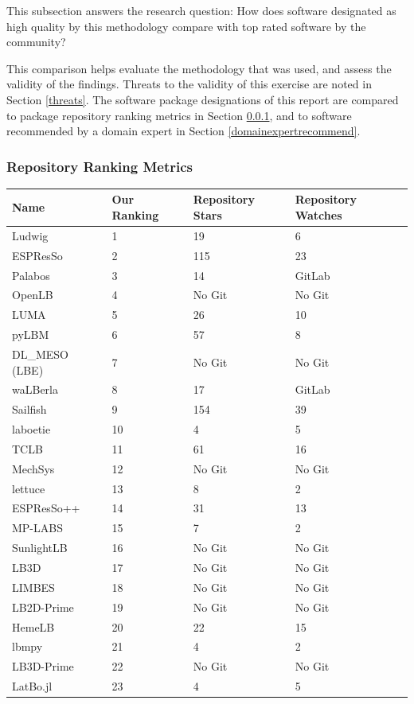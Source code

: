 \documentclass[12pt, notitlepage]{article}
\begin{document}
This subsection answers the research question: How does software designated as high quality by this methodology compare with top rated software by the community?

This comparison helps evaluate the methodology that was used, and assess the validity of the findings. Threats to the validity of this exercise are noted in Section \ref{threats}. The software package designations of this report are compared to package repository ranking metrics in Section \ref{repmetrics}, and to software recommended by a domain expert in Section \ref{domainexpertrecommend}.

\subsubsection{Repository Ranking Metrics}\label{repmetrics}

\begin{center}
	\begin{onehalfspacing}
		\begin{tabular}{ p{3.5cm}p{2.5cm}p{2.5cm}p{2.5cm} }
			\hline
			Name & Our Ranking & Repository Stars & Repository Watches \\
			\hline
			Ludwig&1& 19 & 6\\
			ESPResSo &2& 115 & 23\\
			Palabos &3& 14 & GitLab\\
			OpenLB &4& No Git & No Git\\
			LUMA&5& 26 & 10\\
			pyLBM &6& 57& 8\\
			DL\_MESO (LBE) & 7 & No Git & No Git \\
			waLBerla & 8 & 17 & GitLab\\
			Sailfish &9& 154 & 39\\
			laboetie &10& 4 & 5\\
			TCLB &11& 61 & 16\\
			MechSys &12& No Git & No Git\\
			lettuce &13& 8 & 2\\
			ESPResSo++ &14& 31 & 13\\
			MP-LABS &15& 7 & 2\\			
			SunlightLB & 16& No Git & No Git\\
			LB3D &17& No Git & No Git\\			
			LIMBES &18& No Git & No Git\\
			LB2D-Prime &19& No Git & No Git\\		
			HemeLB &20& 22 & 15\\
			lbmpy&21&  4 & 2  \\	
			LB3D-Prime &22& No Git & No Git\\	
			LatBo.jl &23& 4 & 5\\			
			\hline
		\end{tabular}
		\label{repometrics}
	\end{onehalfspacing}
\end{center}
\end{document}
